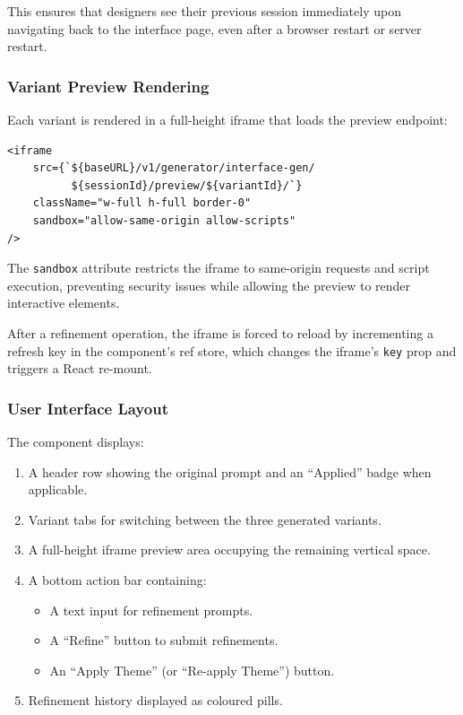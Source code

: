 This ensures that designers see their previous session immediately upon navigating back to the interface page, even after a browser restart or server restart.

\subsubsection{Variant Preview Rendering}

Each variant is rendered in a full-height iframe that loads the preview endpoint:

\begin{verbatim}
<iframe
    src={`${baseURL}/v1/generator/interface-gen/
          ${sessionId}/preview/${variantId}/`}
    className="w-full h-full border-0"
    sandbox="allow-same-origin allow-scripts"
/>
\end{verbatim}

The \texttt{sandbox} attribute restricts the iframe to same-origin requests and script execution, preventing security issues while allowing the preview to render interactive elements.

After a refinement operation, the iframe is forced to reload by incrementing a refresh key in the component's ref store, which changes the iframe's \texttt{key} prop and triggers a React re-mount.

\subsubsection{User Interface Layout}

The component displays:
\begin{enumerate}
    \item A header row showing the original prompt and an ``Applied'' badge when applicable.
    \item Variant tabs for switching between the three generated variants.
    \item A full-height iframe preview area occupying the remaining vertical space.
    \item A bottom action bar containing:
    \begin{itemize}
        \item A text input for refinement prompts.
        \item A ``Refine'' button to submit refinements.
        \item An ``Apply Theme'' (or ``Re-apply Theme'') button.
    \end{itemize}
    \item Refinement history displayed as coloured pills.
\end{enumerate}


